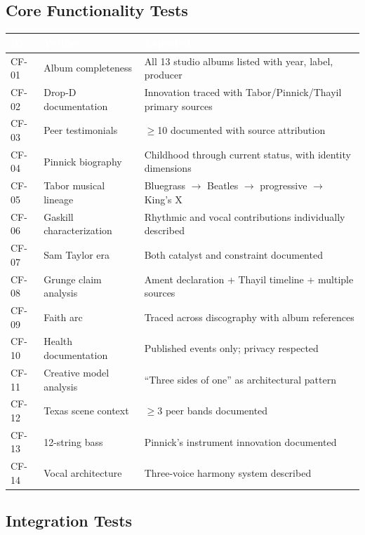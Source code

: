 \documentclass[11pt,letterpaper]{article}
\newcommand{\tableheader}[1]{\textbf{\sffamily\textcolor{white}{#1}}}
\begin{document}
\subsection{Core Functionality Tests}

\begin{center}
\begin{tabularx}{\textwidth}{C{1.2cm}L{3cm}X}
\toprule
{}
\tableheader{ID} & \tableheader{Verifies} & \tableheader{Expected} \\
\midrule
CF-01 & Album completeness & All 13 studio albums listed with year, label, producer \\
CF-02 & Drop-D documentation & Innovation traced with Tabor/Pinnick/Thayil primary sources \\
CF-03 & Peer testimonials & $\geq$10 documented with source attribution \\
CF-04 & Pinnick biography & Childhood through current status, with identity dimensions \\
CF-05 & Tabor musical lineage & Bluegrass $\rightarrow$ Beatles $\rightarrow$ progressive $\rightarrow$ King's X \\
CF-06 & Gaskill characterization & Rhythmic and vocal contributions individually described \\
CF-07 & Sam Taylor era & Both catalyst and constraint documented \\
CF-08 & Grunge claim analysis & Ament declaration + Thayil timeline + multiple sources \\
CF-09 & Faith arc & Traced across discography with album references \\
CF-10 & Health documentation & Published events only; privacy respected \\
CF-11 & Creative model analysis & ``Three sides of one'' as architectural pattern \\
CF-12 & Texas scene context & $\geq$3 peer bands documented \\
CF-13 & 12-string bass & Pinnick's instrument innovation documented \\
CF-14 & Vocal architecture & Three-voice harmony system described \\
\bottomrule
\end{tabularx}
\end{center}

\subsection{Integration Tests}
\end{document}
